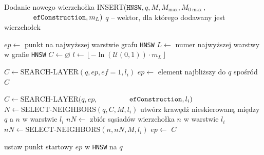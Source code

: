 \documentclass[twocolumn]{article}
\begin{document}
\begin{algorithm}[H]
\caption{Dodanie nowego wierzchołka \newline
INSERT($\texttt{HNSW}, q, M, M_{\max}, M_{0 \max},$ \newline $\makebox[4em][l]{\hfill} 
\texttt{efConstruction}, m_L)$ \newline
$q$ -- wektor, dla którego dodawany jest wierzchołek
}
\label{alg:insert}
\begin{algorithmic}[1]
\STATE $ep \leftarrow$ punkt na najwyższej warstwie grafu \texttt{HNSW}
\STATE $L \leftarrow$ numer najwyższej warstwy w grafie \texttt{HNSW}
\STATE $C \leftarrow \varnothing$ 
\STATE $l \leftarrow \left\lfloor -\ln\left(\mathcal{U}(0,1)\right) \cdot m_L \right\rfloor$ 

    \STATE $C \leftarrow \text{SEARCH-LAYER}(q, ep, ef=1, l_i)$
    \STATE $ep \leftarrow$ element najbliższy do $q$ spośród $C$
\ENDFOR

    \STATE $C \leftarrow \text{SEARCH-LAYER}(q, ep,$ 
    \newline $\makebox[4em][l]{\hfill} \texttt{efConstruction}, l_i)$
    \STATE $N \leftarrow \text{SELECT-NEIGHBORS}(q, C, M, l_i)$
        \STATE utwórz krawędź nieskierowaną między $q$ a $n$ w warstwie $l_i$
            \STATE $nN \leftarrow$ zbiór sąsiadów wierzchołka $n$ w warstwie $l_i$
            \STATE $nN \leftarrow \text{SELECT-NEIGHBORS}(n, nN, M, l_i)$
        \ENDIF
    \ENDFOR
    \STATE $ep \leftarrow$ $C$ 
\ENDFOR

    \STATE ustaw punkt startowy $ep$ w \texttt{HNSW} na $q$
\ENDIF
\end{algorithmic}
\end{algorithm}
\end{document}
